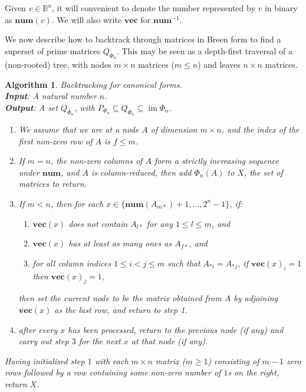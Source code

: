 \documentclass[11pt]{article}
\newtheorem{algo}[thm]{Algorithm}
\newenvironment{alg}{\begin{algo}\rm}{\end{algo}}
\numberwithin{equation}{section}
\DeclareMathOperator{\im}{im}
\newcommand{\num}{\mathbf{num}}
\newcommand{\vect}{\mathbf{vec}}
\newcommand{\B}{\mathbb{B}}
\begin{document}
Given $v \in \B^n$, it will convenient to denote the number represented by $v$
in binary as $\num(v)$. We will also write $\vect$ for $\mathbf{num}^{-1}$.

We now describe how to backtrack through matrices in Breen form to find a
superset of prime matrices $Q_{\Phi_n}$. This may be seen as a depth-first
traversal of a (non-rooted) tree, with nodes $m\times n$ matrices ($m \leq
n$) and leaves $n \times n$ matrices.

\begin{alg}
  Backtracking for canonical forms.\\
  \textbf{Input}: A natural number $n$. \\
  \textbf{Output}: A set $Q_{\Phi_n}$, with $P_{\Phi_n} \subseteq Q_{\Phi_n}
  \subseteq \im\Phi_n$.
  \begin{enumerate}
    \item We assume that we are at a node $A$ of dimension $m \times n$, and the
      index of the first non-zero row of $A$ is $f \leq m$. 
    \item If $m = n$, the non-zero columns of $A$ form a strictly increasing
      sequence under $\num$, and $A$ is column-reduced, then add $\Phi_n(A)$ to
      $X$, the set of matrices to return.
    \item If $m < n$, then for each $x \in \{\num(A_{m*}) + 1,
        \ldots, 2^n - 1\}$, if:
      \begin{enumerate}[label={(\roman*)}]
        \item $\vect(x)$ does not contain $A_{l*}$ for any $1 \leq l \leq m$,
          and
        \item $\vect(x)$ has at least as many ones as $A_{f*}$,
          and
        \item for all column indices $1 \leq i < j \leq m$ such that $A_{*i} =
          A_{*j}$, if $\vect(x)_i = 1$ then $\vect(x)_j = 1$,
      \end{enumerate}
      then set the current node to be the matrix obtained from $A$ by adjoining
      $\vect(x)$ as the last row, and return to step 1.
    \item after every $x$ has been processed, return to the previous node (if
      any) and carry out step $3$ for the next $x$ at that node (if any).
  \end{enumerate}
  Having initialised step $1$ with each $m \times n$ matrix ($m \geq 1$)
  consisting of $m - 1$ zero rows followed by a row containing some non-zero
  number of $1$s on the right, return $X$.
\end{alg}
\end{document}
